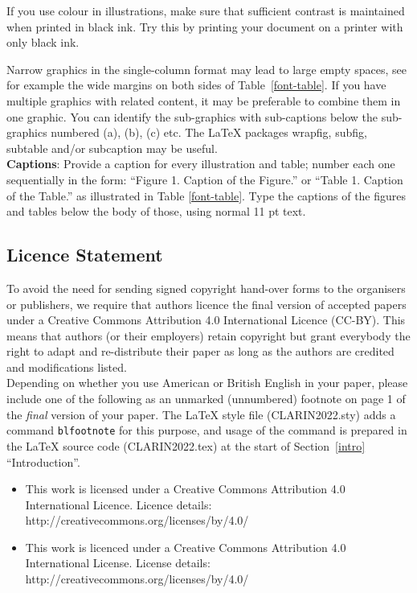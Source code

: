 \documentclass[a4paper,11pt]{article}
\begin{document}
If you use colour in illustrations, make sure that sufficient contrast is maintained
when printed in black ink. Try this by printing your document on a printer
with only black ink.

Narrow graphics in the single-column format may lead to
large empty spaces,
see for example the wide margins on both sides of Table~\ref{font-table}.
If you have multiple graphics with related content, it may be
preferable to combine them in one graphic.
You can identify the sub-graphics with sub-captions below the
sub-graphics numbered (a), (b), (c) etc.
The LaTeX packages wrapfig, subfig, subtable and/or subcaption
may be useful.\\


{\bf Captions}: Provide a caption for every illustration and table; number each one
sequentially in the form:  ``Figure 1. Caption of the Figure.'' or ``Table 1.
Caption of the Table.'' as illustrated in Table \ref{font-table}.
Type the captions of the figures and
tables below the body of those, using normal 11 pt text.


\subsection{Licence Statement}
\label{licence}

To avoid the need for sending signed copyright hand-over forms to the
organisers or publishers, we require that authors licence the final version
of accepted papers under a
Creative Commons Attribution 4.0 International Licence
(CC-BY).
This means that authors (or their employers) retain copyright but
grant everybody
the right to adapt and re-distribute their paper
as long as the authors are credited and modifications listed.\\ %

Depending on whether you use American or British English in your
paper, please include one of the following as an unmarked
(unnumbered) footnote on page 1 of the \emph{final} version of your paper.
The LaTeX style file (CLARIN2022.sty) adds a command
\texttt{blfootnote} for this purpose, and usage of the command is
prepared in the LaTeX source code (CLARIN2022.tex) at the start
of Section~\ref{intro} ``Introduction''.

\begin{itemize}
    \item  This work is licensed under a Creative Commons
           Attribution 4.0 International Licence.
           Licence details:
           {http://creativecommons.org/licenses/by/4.0/}
    \item  This work is licenced under a Creative Commons
           Attribution 4.0 International License.
           License details:
           {http://creativecommons.org/licenses/by/4.0/}
\end{itemize}
\end{document}
